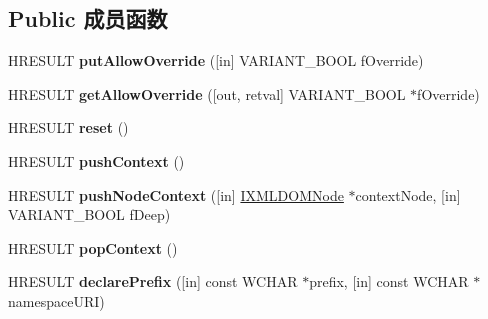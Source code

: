 \subsection*{Public 成员函数}
\begin{DoxyCompactItemize}
\item 
\mbox{\label{interface_m_s_x_m_l2_1_1_i_m_x_namespace_manager_a7010327ea2b84999c33d2cdef0eb25c3}} 
H\+R\+E\+S\+U\+LT {\bfseries put\+Allow\+Override} (\mbox{[}in\mbox{]} V\+A\+R\+I\+A\+N\+T\+\_\+\+B\+O\+OL f\+Override)
\item 
\mbox{\label{interface_m_s_x_m_l2_1_1_i_m_x_namespace_manager_a4bc4fe125f2368a55a2d54bce678effe}} 
H\+R\+E\+S\+U\+LT {\bfseries get\+Allow\+Override} (\mbox{[}out, retval\mbox{]} V\+A\+R\+I\+A\+N\+T\+\_\+\+B\+O\+OL $\ast$f\+Override)
\item 
\mbox{\label{interface_m_s_x_m_l2_1_1_i_m_x_namespace_manager_ae355bf6f86730d5aabfb238344d7ba13}} 
H\+R\+E\+S\+U\+LT {\bfseries reset} ()
\item 
\mbox{\label{interface_m_s_x_m_l2_1_1_i_m_x_namespace_manager_a08d39f648502ef258194bac10147dfad}} 
H\+R\+E\+S\+U\+LT {\bfseries push\+Context} ()
\item 
\mbox{\label{interface_m_s_x_m_l2_1_1_i_m_x_namespace_manager_a32c79639b6b72a22495c91059f7567cb}} 
H\+R\+E\+S\+U\+LT {\bfseries push\+Node\+Context} (\mbox{[}in\mbox{]} \hyperlink{interface_m_s_x_m_l2_1_1_i_x_m_l_d_o_m_node}{I\+X\+M\+L\+D\+O\+M\+Node} $\ast$context\+Node, \mbox{[}in\mbox{]} V\+A\+R\+I\+A\+N\+T\+\_\+\+B\+O\+OL f\+Deep)
\item 
\mbox{\label{interface_m_s_x_m_l2_1_1_i_m_x_namespace_manager_a475969e897c1492d3958f6212031cbb7}} 
H\+R\+E\+S\+U\+LT {\bfseries pop\+Context} ()
\item 
\mbox{\label{interface_m_s_x_m_l2_1_1_i_m_x_namespace_manager_af0eb6d291e8e67e3fbccd63f2e0a3f89}} 
H\+R\+E\+S\+U\+LT {\bfseries declare\+Prefix} (\mbox{[}in\mbox{]} const W\+C\+H\+AR $\ast$prefix, \mbox{[}in\mbox{]} const W\+C\+H\+AR $\ast$namespace\+U\+RI)

\end{DoxyCompactItemize}
